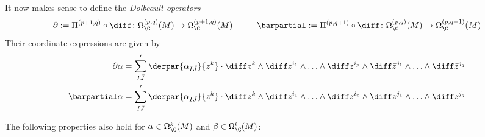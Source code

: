 
It now makes sense to define the \textit{Dolbeault operators}
\[
\partial:=\Pi^{(p+1, q)} \circ \diff \colon \Omega_\C^{(p,q)}(M) \to \Omega_\C^{(p+1, q)}(M) \hspace{1 cm}
\barpartial:=\Pi^{(p, q+1)} \circ \diff \colon \Omega_\C^{(p,q)}(M) \to \Omega_\C^{(p, q+1)}(M)
\]
Their coordinate expressions are given by 
\begin{align*}
    \partial \alpha & = \sum_{I \bar{J}}' \derpar{\alpha_{I \bar{J}}}{z^k} \cdot \diff z^k \wedge \diff z^{i_1} \wedge \ldots \wedge \diff z^{i_p} \wedge \diff \bar{z}^{j_1} \wedge \ldots \wedge \diff \bar{z}^{j_q} \\
    \barpartial \alpha & =\sum_{I \bar{J}}' \derpar{\alpha_{I \bar{J}}}{\bar{z}^k} \cdot \diff \bar{z}^k \wedge \diff z^{i_1} \wedge \ldots \wedge \diff z^{i_p} \wedge \diff \bar{z}^{j_1} \wedge \ldots \wedge \diff \bar{z}^{j_q}
\end{align*}

The following properties also hold for \(\alpha \in \Omega_\C^k(M)\) and \(\beta \in \Omega_\C^\ell(M)\):

